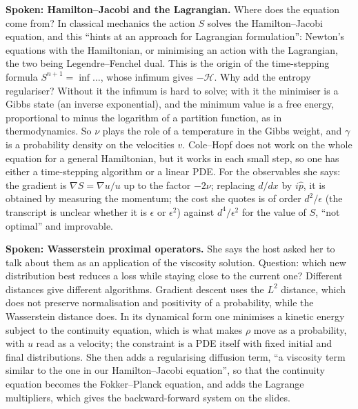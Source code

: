 \medskip\noindent
{\bf Spoken: Hamilton--Jacobi and the
Lagrangian.}
Where does the equation come from? In classical
mechanics the action $S$ solves the
Hamilton--Jacobi equation, and this ``hints at
an approach for Lagrangian formulation'':
Newton's equations with the Hamiltonian,
or minimising an action with the Lagrangian,
the two being Legendre--Fenchel dual. This is
the origin of the time-stepping formula
$S^{n+1}=\inf\dots$, whose infimum gives
$-\mathcal{H}$. Why add the entropy regulariser?
Without it the infimum is hard to solve; with
it the minimiser is a Gibbs state (an inverse
exponential), and the minimum value is a free
energy, proportional to minus the logarithm of
a partition function, as in thermodynamics. So
$\nu$ plays the role of a temperature in the
Gibbs weight, and $\gamma$ is a probability
density on the velocities $v$. Cole--Hopf does
not work on the whole equation for a general
Hamiltonian, but it works in each small step,
so one has either a time-stepping algorithm or
a linear PDE. For the observables she says: the
gradient is $\nabla S=\nabla u/u$ up to the
factor $-2\nu$; replacing $d/dx$ by $i\hat p$,
it is obtained by measuring the momentum; the
cost she quotes is of order $d^2/\epsilon$
(the transcript is unclear whether it is
$\epsilon$ or $\epsilon^2$) against
$d^4/\epsilon^2$ for the value of $S$, ``not
optimal'' and improvable.

\medskip\noindent
{\bf Spoken: Wasserstein proximal operators.}
She says the host asked her to talk about them
as an application of the viscosity solution.
Question: which new distribution best reduces a
loss while staying close to the current one?
Different distances give different algorithms.
Gradient descent uses the $L^2$ distance, which
does not preserve normalisation and positivity
of a probability, while the Wasserstein distance
does. In its dynamical form one minimises a
kinetic energy subject to the continuity
equation, which is what makes $\rho$ move as a
probability, with $u$ read as a velocity;
the constraint is a PDE itself with fixed
initial and final distributions. She then adds
a regularising diffusion term, ``a viscosity
term similar to the one in our
Hamilton--Jacobi equation'', so that the
continuity equation becomes the Fokker--Planck
equation, and adds the Lagrange multipliers,
which gives the backward-forward system on the
slides.

